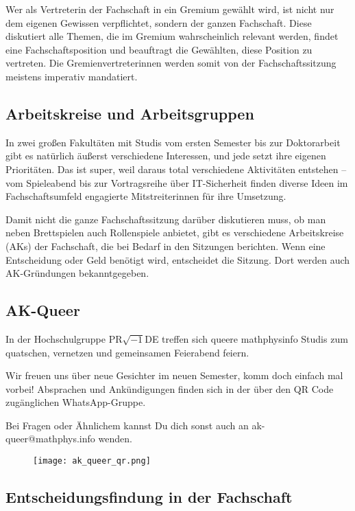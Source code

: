 Wer als Vertreterin der Fachschaft in ein Gremium gewählt wird, ist nicht nur dem eigenen Gewissen verpflichtet, sondern der ganzen Fachschaft. Diese diskutiert alle Themen, die im Gremium wahrscheinlich relevant werden, findet eine Fachschaftsposition und beauftragt die Gewählten, diese Position zu vertreten. Die Gremienvertreterinnen werden somit von der Fachschaftssitzung meistens imperativ mandatiert.

\vspace*{-2mm}
\subsection{Arbeitskreise und Arbeitsgruppen}
In zwei großen Fakultäten mit Studis vom ersten Semester bis zur Doktorarbeit gibt es natürlich äußerst verschiedene Interessen, und jede setzt ihre eigenen Prioritäten. Das ist super, weil daraus total verschiedene Aktivitäten entstehen -- vom Spieleabend bis zur Vortragsreihe über IT-Sicherheit finden diverse Ideen im Fachschaftsumfeld engagierte Mitstreiterinnen für ihre Umsetzung.

Damit nicht die ganze Fachschaftssitzung darüber diskutieren muss, ob man neben Brettspielen auch Rollenspiele anbietet, gibt es verschiedene Arbeitskreise (AKs) der Fachschaft, die bei Bedarf in den Sitzungen berichten. Wenn eine Entscheidung oder Geld benötigt wird, entscheidet die Sitzung. Dort werden auch AK-Gründungen bekanntgegeben.

\vspace*{-2mm}
\subsection{AK-Queer}
In der Hochschulgruppe PR$\sqrt{-1}$DE treffen sich queere mathphysinfo Studis zum quatschen, vernetzen und gemeinsamen Feierabend feiern.

Wir freuen uns über neue Gesichter im neuen Semester, komm doch einfach mal vorbei! Absprachen und Ankündigungen finden sich in der über den QR Code zugänglichen WhatsApp-Gruppe.

Bei Fragen oder Ähnlichem kannst Du dich sonst auch an ak-queer@mathphys.info wenden.
\begin{figure}[h]
    \texttt{[image: ak\_queer\_qr.png]}
\end{figure}

\vspace*{-2mm}
\subsection{Entscheidungsfindung in der Fachschaft}


